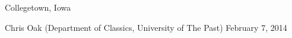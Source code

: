 

\vspace{1ex}

\begin{changemargin}{-0.3in}{0in}
\begin{etaremune}
%

\item
\headedsection %
{}
{Collegetown, Iowa} {

\headedsubsection %
{Chris Oak \textnormal{(Department of Classics, University of The Past)}}
{February 7, 2014}
{\vspace{-0.5\baselineskip}}
}


\end{etaremune}
\end{changemargin}


\spacedhrule{0.5em}{-0.4em} %
